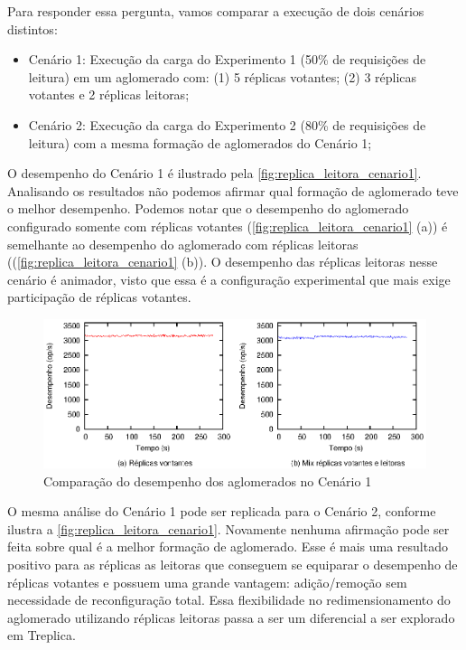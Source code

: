 Para responder essa pergunta, vamos comparar a execução de dois cenários distintos:

\begin{itemize}
  \item Cenário 1: Execução da carga do Experimento 1 (50\% de requisições de leitura)
    em um aglomerado com: (1) 5 réplicas votantes; (2) 3 réplicas votantes e 2 réplicas
    leitoras;
  \item Cenário 2: Execução da carga do Experimento 2 (80\% de requisições de leitura)
    com a mesma formação de aglomerados do Cenário 1;
\end{itemize}

O desempenho do Cenário 1 é ilustrado pela \autoref{fig:replica_leitora_cenario1}.
Analisando os resultados não podemos afirmar qual formação de aglomerado teve o melhor
desempenho. Podemos notar que o desempenho do aglomerado configurado somente com réplicas
votantes (\autoref{fig:replica_leitora_cenario1} (a)) é semelhante ao desempenho do
aglomerado com réplicas leitoras ((\autoref{fig:replica_leitora_cenario1} (b)). O
desempenho das réplicas leitoras nesse cenário é animador, visto que essa é a configuração
experimental que mais exige participação de réplicas votantes.

\begin{figure}[ht]
  \centering
  \includegraphics[width=14cm]{conteudo/capitulos/figuras/final-replica-leitora-pr50.eps}
  \caption{Comparação do desempenho dos aglomerados no Cenário 1}
  \label{fig:replica_leitora_cenario1}
\end{figure}

O mesma análise do Cenário 1 pode ser replicada para o Cenário 2, conforme ilustra a
\autoref{fig:replica_leitora_cenario1}. Novamente nenhuma afirmação pode ser feita sobre
qual é a melhor formação de aglomerado. Esse é mais uma resultado positivo para as réplicas
as leitoras que conseguem se equiparar o desempenho de réplicas votantes e possuem uma
grande vantagem: adição/remoção sem necessidade de reconfiguração total. Essa
flexibilidade no redimensionamento do aglomerado utilizando réplicas leitoras passa a ser
um diferencial a ser explorado em Treplica.

